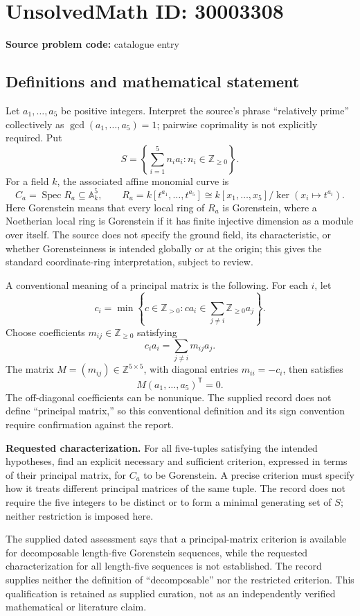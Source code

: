 \documentclass[11pt]{article}
\newcommand{\Z}{\mathbb{Z}}
\begin{document}
\section*{UnsolvedMath ID: 30003308}
\textbf{Source problem code:} catalogue entry
\subsection{Definitions and mathematical statement}
Let \(a_1,\ldots,a_5\) be positive integers. Interpret the source's phrase ``relatively prime'' collectively as \(\gcd(a_1,\ldots,a_5)=1\); pairwise coprimality is not explicitly required. Put
\[
S=\left\{\sum_{i=1}^{5}n_i a_i:n_i\in\Z_{\geq 0}\right\}.
\]
For a field \(k\), the associated affine monomial curve is
\[
C_a=\operatorname{Spec}R_a\subseteq\mathbb A_k^5,\qquad
R_a=k[t^{a_1},\ldots,t^{a_5}]
\cong k[x_1,\ldots,x_5]/\ker\!\left(x_i\mapsto t^{a_i}\right).
\]
Here Gorenstein means that every local ring of \(R_a\) is Gorenstein, where a Noetherian local ring is Gorenstein if it has finite injective dimension as a module over itself. The source does not specify the ground field, its characteristic, or whether Gorensteinness is intended globally or at the origin; this gives the standard coordinate-ring interpretation, subject to review.

A conventional meaning of a principal matrix is the following. For each \(i\), let
\[
c_i=\min\left\{c\in\Z_{>0}:ca_i\in\sum_{j\ne i}\Z_{\geq 0}a_j\right\}.
\]
Choose coefficients \(m_{ij}\in\Z_{\geq 0}\) satisfying
\[
c_i a_i=\sum_{j\ne i}m_{ij}a_j.
\]
The matrix \(M=(m_{ij})\in\Z^{5\times5}\), with diagonal entries \(m_{ii}=-c_i\), then satisfies
\[
M(a_1,\ldots,a_5)^{\mathsf T}=0.
\]
The off-diagonal coefficients can be nonunique. The supplied record does not define ``principal matrix,'' so this conventional definition and its sign convention require confirmation against the report.

\textbf{Requested characterization.} For all five-tuples satisfying the intended hypotheses, find an explicit necessary and sufficient criterion, expressed in terms of their principal matrix, for \(C_a\) to be Gorenstein. A precise criterion must specify how it treats different principal matrices of the same tuple. The record does not require the five integers to be distinct or to form a minimal generating set of \(S\); neither restriction is imposed here.

The supplied dated assessment says that a principal-matrix criterion is available for decomposable length-five Gorenstein sequences, while the requested characterization for all length-five sequences is not established. The record supplies neither the definition of ``decomposable'' nor the restricted criterion. This qualification is retained as supplied curation, not as an independently verified mathematical or literature claim.
\end{document}
